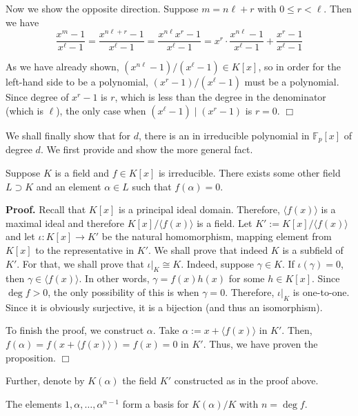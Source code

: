 \documentclass{template}
\newcommand{\qedwhite}{\hfill \ensuremath{\Box}}
\begin{document}
Now we show the opposite direction. Suppose $m=n\ell + r$ with $0 \leq r <
\ell$. Then we have
\begin{equation*}
    \frac{x^m-1}{x^{\ell}-1} = \frac{x^{n\ell+r}-1}{x^{\ell}-1} = \frac{x^{n\ell}x^r-1}{x^{\ell}-1} = x^r \cdot \frac{x^{n\ell} - 1}{x^{\ell}-1} + \frac{x^r-1}{x^{\ell}-1}
\end{equation*}

As we have already shown, $(x^{n\ell}-1)/(x^{\ell}-1) \in K[x]$, so in order for the
left-hand side to be a polynomial, $(x^r-1)/(x^{\ell}-1)$ must be a polynomial.
Since degree of $x^r-1$ is $r$, which is less than the degree in the denominator
(which is $\ell$), the only case when $(x^{\ell}-1) \mid (x^r-1)$ is $r=0$.
\qedwhite

We shall finally show that for $d$, there is an in irreducible 
polynomial in $\mathbb{F}_p[x]$ of degree $d$. We first provide 
and show the more general fact. 
\begin{proposition}
    Suppose $K$ is a field and $f \in K[x]$ is irreducible. There exists some
    other field $L \supset K$ and an element $\alpha \in L$ such that
    $f(\alpha)=0$.
\end{proposition}

\textbf{Proof.} Recall that $K[x]$ is a principal ideal domain. Therefore,
$\langle f(x) \rangle$ is a maximal ideal and therefore $K[x]/\langle f(x)
\rangle$ is a field. Let $K' := K[x]/\langle f(x) \rangle$ and let $\iota: K[x]
\to K'$ be the natural homomorphism, mapping element from $K[x]$ to the
representative in $K'$. We shall prove that indeed $K$ is a subfield of $K'$.
For that, we shall prove that $\iota|_K \cong K$. Indeed, suppose $\gamma \in
K$. If $\iota(\gamma)=0$, then $\gamma \in \langle f(x) \rangle$. In other
words, $\gamma = f(x)h(x)$ for some $h \in K[x]$. Since $\deg f>0$, the only
possibility of this is when $\gamma=0$. Therefore, $\iota|_K$ is one-to-one.
Since it is obviously surjective, it is a bijection (and thus an isomorphism). 

To finish the proof, we construct $\alpha$. Take $\alpha := x + \langle f(x)
\rangle$ in $K'$. Then, $f(\alpha)=f(x+\langle f(x) \rangle) = f(x) = 0$ in
$K'$. Thus, we have proven the proposition. \qedwhite

Further, denote by $K(\alpha)$ the field $K'$ constructed as in the proof above.

\begin{proposition}\label{proposition:alphas}
    The elements $1,\alpha,\dots,\alpha^{n-1}$ form a basis for $K(\alpha)/K$
    with $n = \deg f$.
\end{proposition}
\end{document}
